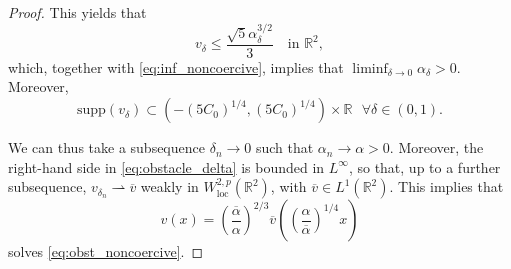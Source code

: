 \documentclass[10pt,a4paper]{article}
\newcommand{\loc}{\mathrm{loc}}
\newcommand{\RR}{\mathbb{R}}
\newcommand{\supp}{\mathrm{supp}}
\newcommand{\faskip}{\hspace{8pt}}
\numberwithin{equation}{section}
\begin{document}
\begin{proof}
	This yields that 
	\[
		v_{\delta} \leq \frac{\sqrt{5}\alpha_{\delta}^{3/2}}{3} \faskip \text{ in } \RR^{2},
	\]
	which, together with \eqref{eq:inf_noncoercive}, implies that $ \liminf_{\delta \rightarrow 0} \alpha_{\delta} > 0 $. Moreover,
	\[
		\supp (v_{\delta})\subset (-(5C_0)^{1/4}, (5C_0)^{1/4}) \times \RR \faskip \forall \delta \in (0,1).
	\]

	We can thus take a subsequence $ \delta_n \rightarrow 0 $ such that $ \alpha_{n} \rightarrow \alpha > 0$. Moreover, the right-hand side in \eqref{eq:obstacle_delta} is bounded in $ L^{\infty} $, so that, up to a further subsequence, $ v_{\delta_n} \rightharpoonup \overline{v} $ weakly in $ W^{2,p}_{\loc}(\RR^{2}) $, with $ \overline{v} \in L^{1}(\RR^{2}) $. This implies that 
	\[ 
		v(x) = \left( \frac{\overline{\alpha}}{\alpha} \right)^{2/3} \overline{v}\left( \left( \frac{\alpha}{\overline{\alpha}} \right)^{1/4} x \right)
	\]
solves \eqref{eq:obst_noncoercive}.
\end{proof}
\end{document}

